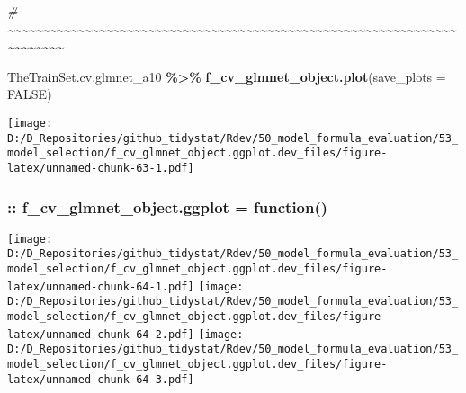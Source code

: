 \documentclass[
]{article}
\newenvironment{Shaded}{\begin{snugshade}}{\end{snugshade}}
\newcommand{\AttributeTok}[1]{\textcolor[rgb]{0.13,0.29,0.53}{#1}}
\newcommand{\CommentTok}[1]{\textcolor[rgb]{0.56,0.35,0.01}{\textit{#1}}}
\newcommand{\ConstantTok}[1]{\textcolor[rgb]{0.56,0.35,0.01}{#1}}
\newcommand{\FunctionTok}[1]{\textcolor[rgb]{0.13,0.29,0.53}{\textbf{#1}}}
\newcommand{\NormalTok}[1]{#1}
\newcommand{\SpecialCharTok}[1]{\textcolor[rgb]{0.81,0.36,0.00}{\textbf{#1}}}
\begin{document}
\begin{Shaded}
\begin{Highlighting}[]
\CommentTok{\#     \textasciitilde{}\textasciitilde{}\textasciitilde{}\textasciitilde{}\textasciitilde{}\textasciitilde{}\textasciitilde{}\textasciitilde{}\textasciitilde{}\textasciitilde{}\textasciitilde{}\textasciitilde{}\textasciitilde{}\textasciitilde{}\textasciitilde{}\textasciitilde{}\textasciitilde{}\textasciitilde{}\textasciitilde{}\textasciitilde{}\textasciitilde{}\textasciitilde{}\textasciitilde{}\textasciitilde{}\textasciitilde{}\textasciitilde{}\textasciitilde{}\textasciitilde{}\textasciitilde{}\textasciitilde{}\textasciitilde{}\textasciitilde{}\textasciitilde{}\textasciitilde{}\textasciitilde{}\textasciitilde{}\textasciitilde{}\textasciitilde{}\textasciitilde{}\textasciitilde{}\textasciitilde{}\textasciitilde{}\textasciitilde{}\textasciitilde{}\textasciitilde{}\textasciitilde{}\textasciitilde{}\textasciitilde{}\textasciitilde{}\textasciitilde{}\textasciitilde{}\textasciitilde{}\textasciitilde{}\textasciitilde{}\textasciitilde{}\textasciitilde{}\textasciitilde{}\textasciitilde{}\textasciitilde{}\textasciitilde{}\textasciitilde{}\textasciitilde{}\textasciitilde{}\textasciitilde{}\textasciitilde{}\textasciitilde{}\textasciitilde{}\textasciitilde{}\textasciitilde{}\textasciitilde{}\textasciitilde{}\textasciitilde{}}

\NormalTok{TheTrainSet.cv.glmnet\_a10 }\SpecialCharTok{\%\textgreater{}\%} \FunctionTok{f\_cv\_glmnet\_object.plot}\NormalTok{(}\AttributeTok{save\_plots =} \ConstantTok{FALSE}\NormalTok{)}
\end{Highlighting}
\end{Shaded}

\texttt{[image: D:/D\_Repositories/github\_tidystat/Rdev/50\_model\_formula\_evaluation/53\_model\_selection/f\_cv\_glmnet\_object.ggplot.dev\_files/figure-latex/unnamed-chunk-63-1.pdf]}

\hypertarget{f_cv_glmnet_object.ggplot-function}{%
\subsubsection{:: f\_cv\_glmnet\_object.ggplot =
function()}\label{f_cv_glmnet_object.ggplot-function}}

\texttt{[image: D:/D\_Repositories/github\_tidystat/Rdev/50\_model\_formula\_evaluation/53\_model\_selection/f\_cv\_glmnet\_object.ggplot.dev\_files/figure-latex/unnamed-chunk-64-1.pdf]}
\texttt{[image: D:/D\_Repositories/github\_tidystat/Rdev/50\_model\_formula\_evaluation/53\_model\_selection/f\_cv\_glmnet\_object.ggplot.dev\_files/figure-latex/unnamed-chunk-64-2.pdf]}
\texttt{[image: D:/D\_Repositories/github\_tidystat/Rdev/50\_model\_formula\_evaluation/53\_model\_selection/f\_cv\_glmnet\_object.ggplot.dev\_files/figure-latex/unnamed-chunk-64-3.pdf]}
\end{document}
